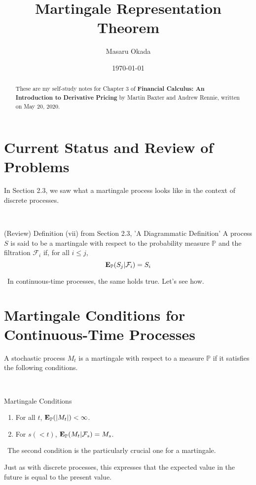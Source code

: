 \documentclass[uplatex,a4j,12pt,dvipdfmx]{jsarticle}
\title{
Martingale Representation Theorem
}
\author{Masaru Okada}
\date{ \today }
\begin{document}
\maketitle
\begin{abstract}
	These are my self-study notes for Chapter 3 of \textbf{Financial Calculus: An Introduction to Derivative Pricing} by Martin Baxter and Andrew Rennie, written on May 20, 2020.
\end{abstract}

\section{Current Status and Review of Problems}

In Section 2.3, we saw what a martingale process looks like in the context of discrete processes.

\
%
\begin{itembox}[l]{(Review) Definition (vii) from Section 2.3, 'A Diagrammatic Definition'}
	A process $S$ is said to be a martingale with respect to the probability measure $\mathbb{P}$ and the filtration $\mathcal{F}_{i}$ if, for all $i \leq j$,
	$$
		{\bf E}_{\mathbb{P}}( S_{j} | \mathcal{F}_{i} ) = S_{i}
	$$
\end{itembox}
%

\
In continuous-time processes, the same holds true. Let's see how.
\section{Martingale Conditions for Continuous-Time Processes}

A stochastic process $M_{t}$ is a martingale with respect to a measure $\mathbb{P}$ if it satisfies the following conditions.

\
%
\begin{itembox}[l]{Martingale Conditions}
	\begin{enumerate}
		\item For all $t$, ${\bf E}_{\mathbb{P}}( | M_{t} | ) < \infty$.
		\item For $s(<t)$, ${\bf E}_{\mathbb{P}}( M_{t} | \mathcal{F}_{s} ) = M_{s}$.
	\end{enumerate}
\end{itembox}
%

\
The second condition is the particularly crucial one for a martingale.

Just as with discrete processes, this expresses that the expected value in the future is equal to the present value.
\end{document}
